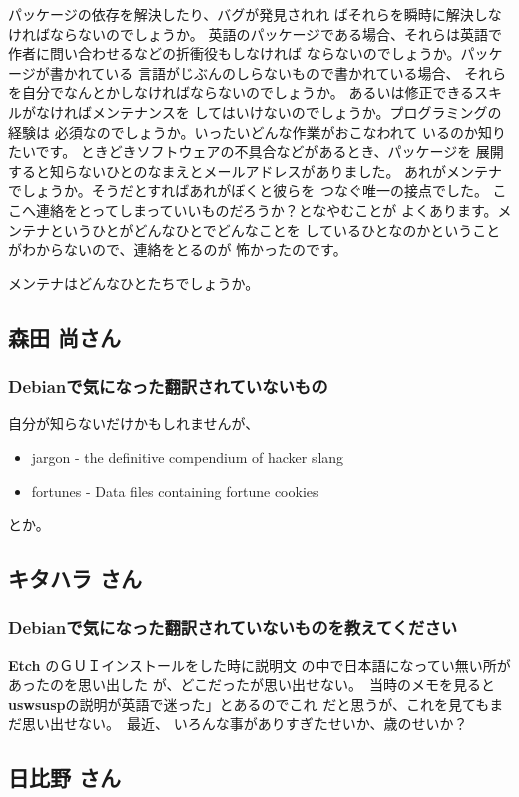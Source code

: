 \documentclass[mingoth,a4paper]{jsarticle}
\begin{document}
パッケージの依存を解決したり、バグが発見されれ
ばそれらを瞬時に解決しなければならないのでしょうか。
英語のパッケージである場合、それらは英語で
作者に問い合わせるなどの折衝役もしなければ
ならないのでしょうか。パッケージが書かれている
言語がじぶんのしらないもので書かれている場合、
それらを自分でなんとかしなければならないのでしょうか。
あるいは修正できるスキルがなければメンテナンスを
してはいけないのでしょうか。プログラミングの経験は
必須なのでしょうか。いったいどんな作業がおこなわれて
いるのか知りたいです。
ときどきソフトウェアの不具合などがあるとき、パッケージを
展開すると知らないひとのなまえとメールアドレスがありました。
あれがメンテナでしょうか。そうだとすればあれがぼくと彼らを
つなぐ唯一の接点でした。
ここへ連絡をとってしまっていいものだろうか？となやむことが
よくあります。メンテナというひとがどんなひとでどんなことを
しているひとなのかということがわからないので、連絡をとるのが
怖かったのです。

メンテナはどんなひとたちでしょうか。


\subsection{森田 尚さん}
\subsubsection{Debianで気になった翻訳されていないもの}
自分が知らないだけかもしれませんが、
\begin{itemize}
  \item jargon - the definitive compendium of hacker slang
  \item fortunes - Data files containing fortune cookies
\end{itemize}
とか。

\subsection{キタハラ さん}
\subsubsection{Debianで気になった翻訳されていないものを教えてください}
{\bf Etch} のＧＵＩインストールをした時に説明文
の中で日本語になってい無い所があったのを思い出した
が、どこだったが思い出せない。　当時のメモを見ると
{\bf uswsusp}の説明が英語で迷った」とあるのでこれ
だと思うが、これを見てもまだ思い出せない。　最近、
いろんな事がありすぎたせいか、歳のせいか？


\subsection{日比野 さん}
\end{document}
